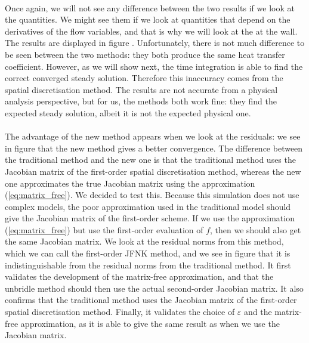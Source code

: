         \paragraph{}
        Once again, we will not see any difference between the two results if we look at the  quantities.
        We might see them if we look at quantities that depend on the derivatives of the flow variables, and that is why we will look at the  at the wall.
        The results are displayed in figure .
        Unfortunately, there is not much difference to be seen between the two methods: they both produce the same heat transfer coefficient.
        However, as we will show next, the time integration is able to find the correct converged steady solution.
        Therefore this inaccuracy comes from the spatial discretisation method.
        The results are not accurate from a physical analysis perspective, but for us, the methods both work fine: they find the expected steady solution, albeit it is not the expected physical one.

        \paragraph{}
        The advantage of the new method appears when we look at the residuals: we see in figure  that the new method gives a better convergence.
        The difference between the traditional method and the new one is that the traditional method uses the Jacobian matrix of the first-order spatial discretisation method, whereas the new one approximates the true Jacobian matrix using the approximation (\ref{eq:matrix_free}).
        We decided to test this.
        Because this simulation does not use complex models, the poor approximation used in the traditional model should give the Jacobian matrix of the first-order scheme.
        If we use the approximation (\ref{eq:matrix_free}) but use the first-order evaluation of $f$, then we should also get the same Jacobian matrix.
        We look at the residual norms from this method, which we can call the first-order JFNK method, and we see in figure  that it is indistinguishable from the residual norms from the traditional method.
        It first validates the development of the matrix-free approximation, and that the unbridle method should then use the actual second-order Jacobian matrix.
        It also confirms that the traditional method uses the Jacobian matrix of the first-order spatial discretisation method.
        Finally, it validates the choice of $\varepsilon$ and the matrix-free approximation, as it is able to give the same result as when we use the Jacobian matrix.


